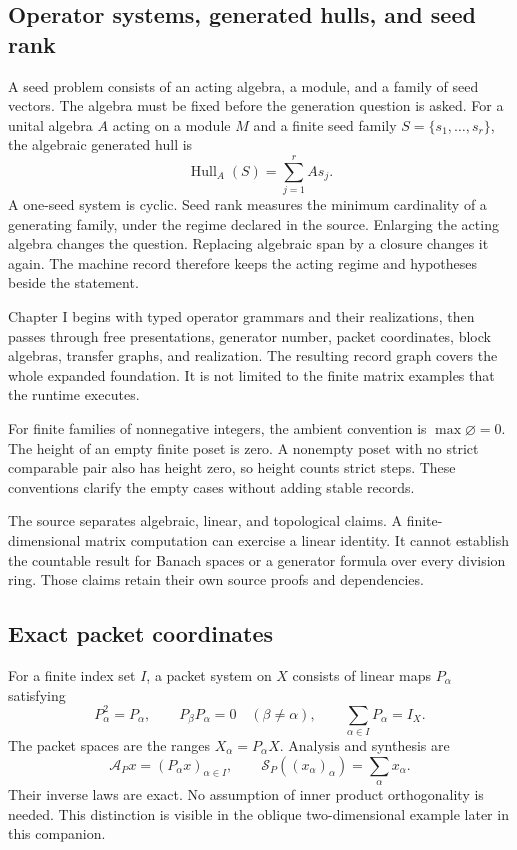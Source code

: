 \documentclass[a4paper,11pt]{article}
\newcommand{\Hull}{\operatorname{Hull}}\newcommand{\srank}{\operatorname{srank}}\newcommand{\psrank}{\operatorname{psrank}}\newcommand{\End}{\operatorname{End}}\newcommand{\Hom}{\operatorname{Hom}}\newcommand{\im}{\operatorname{im}}\newcommand{\Ker}{\operatorname{Ker}}\newcommand{\Jac}{\operatorname{Jac}}\newcommand{\Irr}{\operatorname{Irr}}\newcommand{\Span}{\operatorname{span}}\newcommand{\alg}{\operatorname{alg}}\newcommand{\Reach}{\operatorname{Reach}}\newcommand{\Supp}{\operatorname{Supp}}\newcommand{\id}{\mathrm{id}}\newcommand{\cl}[1]{\overline{#1}}
\begin{document}
\subsection{Operator systems, generated hulls, and seed rank}
A seed problem consists of an acting algebra, a module, and a family of seed vectors. The algebra must be fixed before the generation question is asked. For a unital algebra $A$ acting on a module $M$ and a finite seed family $S=\{s_1,\ldots,s_r\}$, the algebraic generated hull is
\[
\Hull_A(S)=\sum_{j=1}^{r}As_j.
\]
A one-seed system is cyclic. Seed rank measures the minimum cardinality of a generating family, under the regime declared in the source. Enlarging the acting algebra changes the question. Replacing algebraic span by a closure changes it again. The machine record therefore keeps the acting regime and hypotheses beside the statement.

Chapter I begins with typed operator grammars and their realizations, then passes through free presentations, generator number, packet coordinates, block algebras, transfer graphs, and realization. The resulting record graph covers the whole expanded foundation. It is not limited to the finite matrix examples that the runtime executes.

For finite families of nonnegative integers, the ambient convention is $\max\varnothing=0$. The height of an empty finite poset is zero. A nonempty poset with no strict comparable pair also has height zero, so height counts strict steps. These conventions clarify the empty cases without adding stable records.

The source separates algebraic, linear, and topological claims. A finite-dimensional matrix computation can exercise a linear identity. It cannot establish the countable result for Banach spaces or a generator formula over every division ring. Those claims retain their own source proofs and dependencies.
\subsection{Exact packet coordinates}
For a finite index set $I$, a packet system on $X$ consists of linear maps $P_\alpha$ satisfying
\[
P_\alpha^2=P_\alpha,\qquad
P_\beta P_\alpha=0\quad(\beta\ne\alpha),\qquad
\sum_{\alpha\in I}P_\alpha=I_X.
\]
The packet spaces are the ranges $X_\alpha=P_\alpha X$. Analysis and synthesis are
\[
\mathcal A_Px=(P_\alpha x)_{\alpha\in I},\qquad
\mathcal S_P((x_\alpha)_\alpha)=\sum_\alpha x_\alpha.
\]
Their inverse laws are exact. No assumption of inner product orthogonality is needed. This distinction is visible in the oblique two-dimensional example later in this companion.
\end{document}
